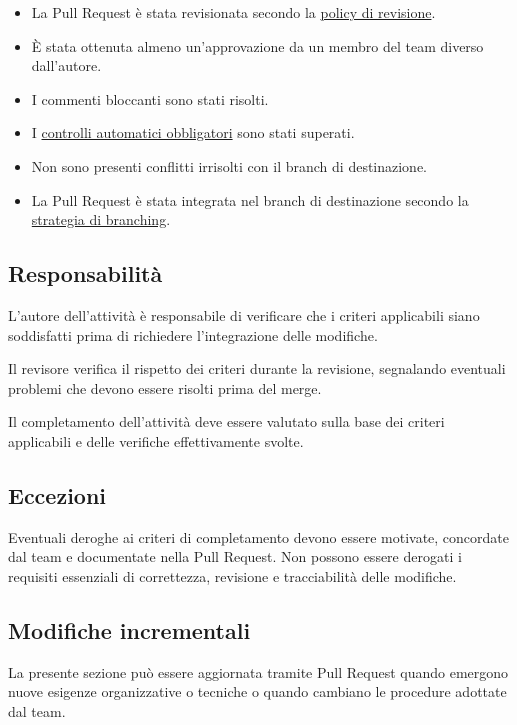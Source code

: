 \documentclass[11pt, a4paper]{article}
\begin{document}
\begin{itemize}
    \item La Pull Request è stata revisionata secondo la \hyperref[subsec:approvazione-e-merge]{policy di revisione}.
    \item È stata ottenuta almeno un'approvazione da un membro del team diverso dall'autore.
    \item I commenti bloccanti sono stati risolti.
    \item I \href{https://github.com/On-By-One-Team/On-By-One.github.io/tree/main/.github/workflows}{controlli automatici obbligatori} sono stati superati.
    \item Non sono presenti conflitti irrisolti con il branch di destinazione.
    \item La Pull Request è stata integrata nel branch di destinazione secondo la \hyperref[sec:strategia-di-branching]{strategia di branching}.
\end{itemize}

\subsection{Responsabilità}

L'autore dell'attività è responsabile di verificare che i criteri applicabili siano soddisfatti prima di richiedere l'integrazione delle modifiche.

Il revisore verifica il rispetto dei criteri durante la revisione, segnalando eventuali problemi che devono essere risolti prima del merge.

Il completamento dell'attività deve essere valutato sulla base dei criteri applicabili e delle verifiche effettivamente svolte.

\subsection{Eccezioni}

Eventuali deroghe ai criteri di completamento devono essere motivate, concordate dal team e documentate nella Pull Request. Non possono essere derogati i requisiti essenziali di correttezza, revisione e tracciabilità delle modifiche.

\subsection{Modifiche incrementali}

La presente sezione può essere aggiornata tramite Pull Request quando emergono nuove esigenze organizzative o tecniche o quando cambiano le procedure adottate dal team.
\end{document}
